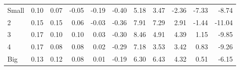 \begin{table}[!ht]
\begin{tabular}{lrrrrrrrrrr}
    \\
      \cmidrule(r){2-6} \cmidrule(r){7-11}

    Small   & 0.10  & 0.07  & -0.05  & -0.19  & -0.40  & 5.18  & 3.47  & -2.36  & -7.33  & -8.74  \\
         2  & 0.15  & 0.15  & 0.06  & -0.03  & -0.36  & 7.91  & 7.29  & 2.91  & -1.44  & -11.04  \\
         3  & 0.17  & 0.10  & 0.10  & 0.03  & -0.30  & 8.46  & 4.91  & 4.39  & 1.15  & -9.85  \\
         4  & 0.17  & 0.08  & 0.08  & 0.02  & -0.29  & 7.18  & 3.53  & 3.42  & 0.83  & -9.26  \\
    Big     & 0.13  & 0.12  & 0.08  & 0.01  & -0.19  & 6.30  & 6.43  & 4.32  & 0.51  & -6.15  \\

  

  \bottomrule
\end{tabular}
\label{tbl:25_Size_Var_C97b}
\end{table}
